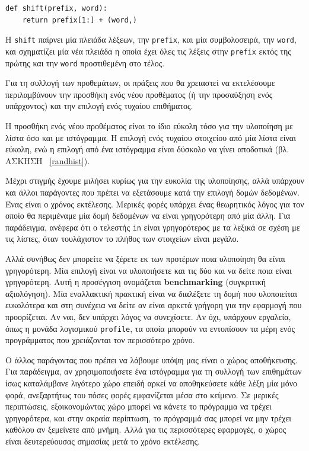 \documentclass[10pt]{book}
\begin{document}
\begin{verbatim}
def shift(prefix, word):
    return prefix[1:] + (word,)
\end{verbatim}
%
 Η  {\tt shift}  παίρνει μία πλειάδα λέξεων, την  {\tt prefix},  και μία συμβολοσειρά, την  {\tt word},  και σχηματίζει μία νέα πλειάδα η οποία έχει όλες τις λέξεις στην  {\tt prefix}  εκτός της πρώτης και την  {\tt word}  προστιθεμένη στο τέλος.

Για τη συλλογή των προθεμάτων, οι πράξεις που θα χρειαστεί να εκτελέσουμε περιλαμβάνουν την προσθήκη ενός νέου προθέματος (ή την προσαύξηση ενός υπάρχοντος) και την επιλογή ενός τυχαίου επιθήματος.

Η προσθήκη ενός νέου προθέματος είναι το ίδιο εύκολη τόσο για την υλοποίηση με λίστα όσο και με ιστόγραμμα. 
Η επιλογή ενός τυχαίου στοιχείου από μία λίστα είναι εύκολη, ενώ η επιλογή από ένα ιστόγραμμα είναι δύσκολο να 
γίνει αποδοτικά (βλ. ΑΣΚΗΣΗ ~\ref{randhist}).

 Μέχρι στιγμής έχουμε μιλήσει κυρίως για την ευκολία της υλοποίησης, αλλά υπάρχουν και άλλοι παράγοντες που πρέπει 
να εξετάσουμε κατά την επιλογή δομών δεδομένων. Ένας είναι ο χρόνος εκτέλεσης. Μερικές φορές υπάρχει ένας θεωρητικός λόγος 
για τον οποίο θα περιμέναμε μία δομή δεδομένων να είναι γρηγορότερη από μία άλλη. Για παράδειγμα, ανέφερα ότι ο τελεστής  
{\tt in}  είναι γρηγορότερος με τα λεξικά σε σχέση με τις λίστες, όταν τουλάχιστον το πλήθος των στοιχείων είναι μεγάλο.

Αλλά συνήθως δεν μπορείτε να ξέρετε εκ των προτέρων ποια υλοποίηση θα είναι γρηγορότερη. Μία επιλογή είναι να υλοποιήσετε 
και τις δύο και να δείτε ποια είναι γρηγορότερη. Αυτή η προσέγγιση ονομάζεται  {\bf benchmarking}  (συγκριτική αξιολόγηση). Μία εναλλακτική πρακτική είναι να διαλέξετε τη δομή που υλοποιείται ευκολότερα και στη συνέχεια να δείτε αν 
είναι αρκετά γρήγορη για την εφαρμογή που προορίζεται. Αν ναι, δεν υπάρχει λόγος να συνεχίσετε. Αν όχι, υπάρχουν εργαλεία, όπως 
η μονάδα λογισμικού  {\tt profile},  τα οποία μπορούν να εντοπίσουν τα μέρη ενός προγράμματος που χρειάζονται τον περισσότερο χρόνο.

 Ο άλλος παράγοντας που πρέπει να λάβουμε υπόψη μας είναι ο χώρος αποθήκευσης. Για παράδειγμα, αν χρησιμοποιήσετε ένα 
ιστόγραμμα για τη συλλογή των επιθημάτων ίσως καταλάμβανε λιγότερο χώρο επειδή αρκεί να αποθηκεύσετε κάθε λέξη μία μόνο φορά, 
ανεξαρτήτως του πόσες φορές εμφανίζεται μέσα στο κείμενο. Σε μερικές περιπτώσεις, εξοικονομώντας χώρο μπορεί να κάνετε το πρόγραμμα να τρέχει γρηγορότερα, και στην ακραία περίπτωση, το πρόγραμμά σας μπορεί να μην τρέχει καθόλου αν ξεμείνετε από μνήμη. Αλλά για τις περισσότερες εφαρμογές, ο χώρος είναι δευτερεύουσας σημασίας μετά το χρόνο εκτέλεσης.
\end{document}
